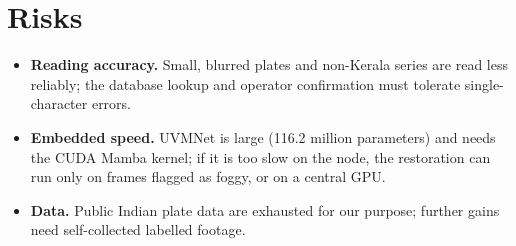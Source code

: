 \section{Risks}

\begin{itemize}
  \item \textbf{Reading accuracy.} Small, blurred plates and non-Kerala series
        are read less reliably; the database lookup and operator confirmation
        must tolerate single-character errors.
  \item \textbf{Embedded speed.} UVMNet is large (116.2 million parameters)
        and needs the CUDA Mamba kernel; if it is too slow on the node, the
        restoration can run only on frames flagged as foggy, or on a central
        GPU.
  \item \textbf{Data.} Public Indian plate data are exhausted for our purpose;
        further gains need self-collected labelled footage.
\end{itemize}
